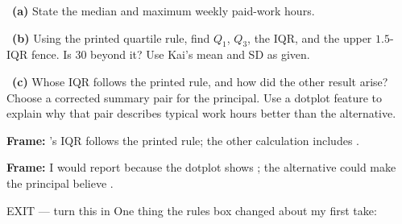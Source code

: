 \documentclass[11pt]{article}
\begin{document}
~\textbf{(a)} State the median and maximum weekly paid-work hours.\par
\workspace{0.7in}

~\textbf{(b)} Using the printed quartile rule, find $Q_1$, $Q_3$, the IQR, and the upper $1.5$-IQR fence. Is 30 beyond it? Use Kai's mean and SD as given.\par
\workspace{1.4in}

~\textbf{(c)} Whose IQR follows the printed rule, and how did the other result arise? Choose a corrected summary pair for the principal. Use a dotplot feature to explain why that pair describes typical work hours better than the alternative.\par
\workspace{2.0in}

\begin{sentenceframebox}\raggedright\textbf{Frame:} \blank[0.8in]'s IQR follows the printed rule; the other calculation includes \blank[1.6in].\end{sentenceframebox}

\begin{sentenceframebox}\raggedright\textbf{Frame:} I would report \blank[1.3in] because the dotplot shows \blank[2in]; the alternative could make the principal believe \blank[2.2in].\end{sentenceframebox}

\begin{summaryexitbox}{EXIT --- turn this in}
One thing the rules box changed about my first take: \hrulefill\par
\workspace{0.4in}
\end{summaryexitbox}
\end{document}
